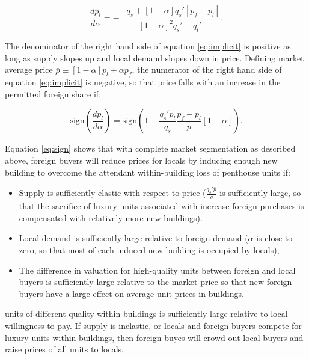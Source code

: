 \documentclass[12pt]{article}
\begin{document}
\begin{equation}
	\label{eq:implicit}
	\frac{dp_{l}}{d\alpha} = -\frac{-q_{s} + \left[1-\alpha\right]q_{s}'\left[p_{f}-p_{l}\right]}{\left[1-\alpha\right]^{2}q_{s}'-q_{l}'}.
\end{equation}

The denominator of the right hand side of equation \eqref{eq:implicit} is positive as long as supply slopes up and local demand slopes down in price. Defining market average price $\bar{p}\equiv \left[1-\alpha\right]p_{l} + \alpha p_{f}$, the numerator of the right hand side of equation \eqref{eq:implicit} is negative, so that price falls with an increase in the permitted foreign share if:

\begin{equation}
	\label{eq:sign}
	\text{sign}\left(\frac{dp_{l}}{d\alpha}\right) = \text{sign}\left(1-\frac{q_{s}'p_{l}}{q_{s}}\frac{p_{f}-p_{l}}{\bar{p}}\left[1-\alpha\right]\right).
\end{equation}

Equation \eqref{eq:sign} shows that with complete market segmentation as described above, foreign buyers will reduce prices for locals by inducing enough new building to overcome the attendant within-building loss of penthouse units if:
\begin{itemize}
\item Supply is sufficiently elastic with respect to price ($\frac{q_{s}'\bar{p}}{q}$ is sufficiently large, so that the sacrifice of luxury units associated with increase foreign purchases is compensated with relatively more new buildings).
	\item Local demand is sufficiently large relative to foreign demand ($\alpha$ is close to zero, so that most of each induced new building is occupied by locals),
	\item The difference in valuation for high-quality units between foreign and local buyers is sufficiently large relative to the market price so that new foreign buyers have a large effect on average unit prices in buildings.
\end{itemize}

units of different quality within buildings is sufficiently large relative to local willingness to pay. If supply is inelastic, or locals and foreign buyers compete for luxury units within buildings, then foreign buyes will crowd out local buyers and raise prices of all units to locals.
\end{document}
